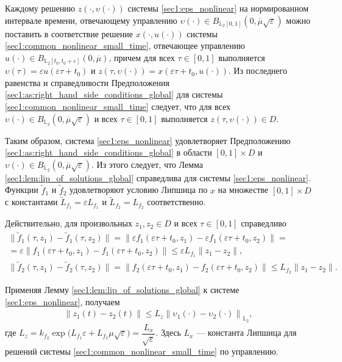\documentclass[../main.tex]{subfiles}
\begin{document}
Каждому решению $z(\cdot, \upsilon(\cdot))$ системы \eqref{sec1:eps_nonlinear} на нормированном интервале времени, отвечающему управлению $\upsilon(\cdot) \in B_{\mathbb{L}_2[0, 1]} (0, \overline{\mu} \sqrt{\varepsilon})$ можно поставить в соответствие решение $x(\cdot, u(\cdot))$ системы \eqref{sec1:common_nonlinear_small_time}, отвечающее управлению $u(\cdot) \in B_{\mathbb{L}_2[t_0, t_0 + \varepsilon]} (0, \overline{\mu})$, причем для всех $\tau \in [0, 1] $ выполняется $ \upsilon(\tau) = \varepsilon u(\varepsilon \tau + t_0)$ и $ z(\tau, \upsilon(\cdot)) = x(\varepsilon \tau + t_0, u(\cdot)) $.
Из последнего равенства и справедливости Предположения \ref{sec1:as:right_hand_side_conditions_global} для системы \eqref{sec1:common_nonlinear_small_time} следует, что для всех  $\upsilon(\cdot) \in B_{\mathbb{L}_2}(0, \overline{\mu}\sqrt{\varepsilon})$ и всех $\tau \in [0, 1] $ выполняется $z(\tau, \upsilon(\cdot)) \in D$. 

Таким образом, система \eqref{sec1:eps_nonlinear}  удовлетворяет Предположению  \ref{sec1:as:right_hand_side_conditions_global} в области $[0, 1]\times D$ и $\upsilon(\cdot) \in B_{\mathbb{L}_2}(0, \overline{\mu}\sqrt{\varepsilon}) $.
Из этого следует, что Лемма \ref{sec1:lem:lip_of_solutions_global} справедлива для системы  \eqref{sec1:eps_nonlinear}.
Функции  $\widetilde{f}_1$ и $\widetilde{f}_2$ удовлетворяют условию Липшица по $x$ на множестве $[0, 1]\times D$ с константами $\widetilde{L}_{f_1} = \varepsilon L_{f_1} $ и  $\widetilde{L}_{f_2} = L_{f_2} $ соответственно. 

Действительно, для произвольных $z_1, z_2 \in D$ и всех  $\tau \in [0, 1]$ справедливо
\begin{gather*}
	\|  \widetilde{f}_1(\tau, z_1) -  \widetilde{f}_1(\tau, z_2) \| = \|  \varepsilon f_1(\varepsilon \tau + t_0, z_1) -   \varepsilon f_1(\varepsilon \tau + t_0, z_2) \| = \\ =
	\varepsilon \|  f_1(\varepsilon \tau + t_0, z_1) -  f_1(\varepsilon \tau + t_0, z_2) \| \leqslant \varepsilon L_{f_1} \|z_1 - z_2 \|, \\
	\| \widetilde{f}_2 (\tau,z_1) - \widetilde{f}_2 (\tau,z_2) \| =  \| f_2(\varepsilon \tau + t_0,z_1) - f_2(\varepsilon \tau + t_0,z_2) \| \leqslant  L_{f_2} \|z_1 - z_2 \|.
\end{gather*}
    
Применяя Лемму \ref{sec1:lem:lip_of_solutions_global}   к системе \eqref{sec1:eps_nonlinear}, получаем
\begin{gather*}
    \left\| z_1(t) - z_2(t) \right\| \leqslant L_z \left\|\upsilon_1(\cdot) - \upsilon_2(\cdot) \right\|_{\mathbb{L}_2},
\end{gather*}
где $ L_z = k_{f_2} \exp\Big( L_{f_1} \varepsilon + L_{f_2} \mu \sqrt{\varepsilon} \Big) = \dfrac{L_x}{\sqrt{\varepsilon}}$.
Здесь $L_x$ --- константа Липшица для решений системы \eqref{sec1:common_nonlinear_small_time} по управлению.
    
\end{document}
